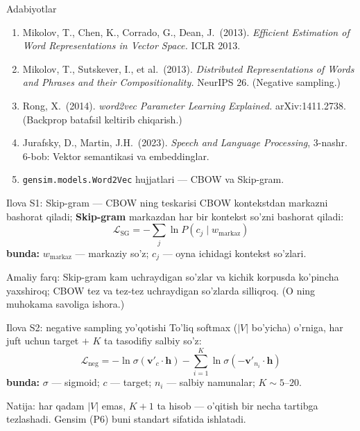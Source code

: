 \documentclass[aspectratio=169,11pt]{beamer}
\newcommand{\bunda}[1]{{\small\textbf{bunda:}\; #1}}
\begin{document}
\begin{frame}{Adabiyotlar}
  \begin{enumerate}\small\setlength\itemsep{5pt}
    \item Mikolov, T., Chen, K., Corrado, G., Dean, J.\ (2013). \textit{Efficient
          Estimation of Word Representations in Vector Space.} ICLR 2013.
    \item Mikolov, T., Sutskever, I., et al.\ (2013). \textit{Distributed
          Representations of Words and Phrases and their Compositionality.}
          NeurIPS 26. (Negative sampling.)
    \item Rong, X.\ (2014). \textit{word2vec Parameter Learning Explained.}
          arXiv:1411.2738. (Backprop batafsil keltirib chiqarish.)
    \item Jurafsky, D., Martin, J.H.\ (2023). \textit{Speech and Language
          Processing}, 3-nashr. 6-bob: Vektor semantikasi va embeddinglar.
    \item \texttt{gensim.models.Word2Vec} hujjatlari --- CBOW va Skip-gram.
  \end{enumerate}
\end{frame}

\appendix

\begin{frame}{Ilova S1: Skip-gram --- CBOW ning teskarisi}
  \small
  CBOW kontekstdan markazni bashorat qiladi; \textbf{Skip-gram} markazdan har bir
  kontekst so'zni bashorat qiladi:
  $$ \mathcal{L}_{\text{SG}} = -\sum_{j} \ln P(c_j \mid w_{\text{markaz}}) $$
  \bunda{$w_{\text{markaz}}$ --- markaziy so'z; $c_j$ --- oyna ichidagi kontekst
  so'zlari.}
  \vspace{4pt}

  Amaliy farq: Skip-gram kam uchraydigan so'zlar va kichik korpusda ko'pincha
  yaxshiroq; CBOW tez va tez-tez uchraydigan so'zlarda silliqroq. (O ning
  muhokama savoliga ishora.)
\end{frame}

\begin{frame}{Ilova S2: negative sampling yo'qotishi}
  \small
  To'liq softmax ($|V|$ bo'yicha) o'rniga, har juft uchun target $+$ $K$ ta
  tasodifiy salbiy so'z:
  $$ \mathcal{L}_{\text{neg}} = -\ln\sigma(\mathbf{v}'_c\cdot\mathbf{h})
     -\sum_{i=1}^{K} \ln\sigma(-\mathbf{v}'_{n_i}\cdot\mathbf{h}) $$
  \bunda{$\sigma$ --- sigmoid; $c$ --- target; $n_i$ --- salbiy namunalar;
  $K\sim 5$--$20$.}
  \vspace{4pt}

  Natija: har qadam $|V|$ emas, $K{+}1$ ta hisob --- o'qitish bir necha tartibga
  tezlashadi. Gensim (P6) buni standart sifatida ishlatadi.
\end{frame}
\end{document}
